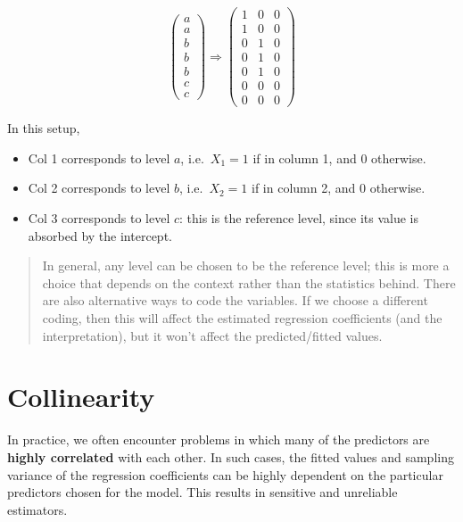 \documentclass[
]{book}
\begin{document}
\[\left(\begin{array}{c} 
      a \\ a \\ b \\ b \\ b \\ c \\ c
    \end{array}\right)
    \Longrightarrow 
    \left(\begin{array}{ccc} 
      1 & 0 & 0\\ 1 & 0 & 0\\ 0 & 1 & 0\\ 0 & 1 & 0 \\ 0 & 1 & 0\\ 0 & 0 & 0\\ 0& 0 & 0
    \end{array}\right)
    \]

In this setup,

\begin{itemize}
\item
  Col 1 corresponds to level \(a\), i.e.~\(X_1 = 1\) if in column 1, and \(0\) otherwise.
\item
  Col 2 corresponds to level \(b\), i.e.~\(X_2 = 1\) if in column 2, and \(0\) otherwise.
\item
  Col 3 corresponds to level \(c\): this is the reference level, since its value is absorbed by the intercept.
\end{itemize}

\begin{quote}
In general, any level can be chosen to be the reference level; this is more a choice that depends on the context rather than the statistics behind. There are also alternative ways to code the variables. If we choose a different coding, then this will affect the estimated regression coefficients (and the interpretation), but it won't affect the predicted/fitted values.
\end{quote}

\section{Collinearity}\label{collinearity}

In practice, we often encounter problems in which many of the predictors are \textbf{highly correlated} with each other. In such cases, the fitted values and sampling variance of the regression coefficients can be highly dependent on the particular predictors chosen for the model. This results in sensitive and unreliable estimators.
\end{document}
